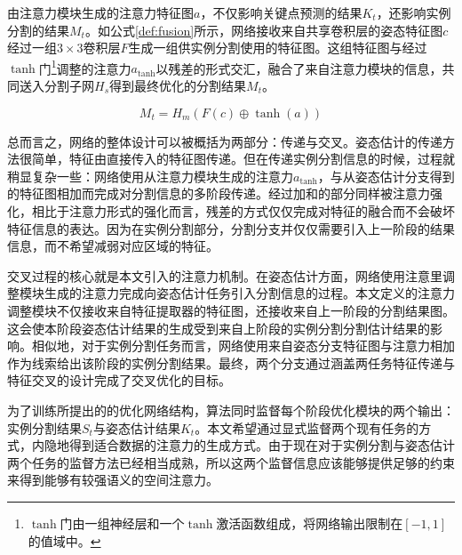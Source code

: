 由注意力模块生成的注意力特征图$a$，不仅影响关键点预测的结果$K_t$，还影响实例分割的结果$M_t$。如公式\eqref{def:fusion}所示，网络接收来自共享卷积层的姿态特征图$c$经过一组$3\times3$卷积层$F$生成一组供实例分割使用的特征图。这组特征图与经过$\tanh$门\footnote{$\tanh$门由一组神经层和一个$\tanh$激活函数组成，将网络输出限制在$[-1, 1]$的值域中。}调整的注意力$a_{\tanh}$以残差的形式交汇，融合了来自注意力模块的信息，共同送入分割子网$H_s$得到最终优化的分割结果$M_t$。

\begin{equation}
\label{def:fusion}
M_t = H_m(F(c) \oplus \tanh(a))
\end{equation}

总而言之，网络的整体设计可以被概括为两部分：传递与交叉。姿态估计的传递方法很简单，特征由直接传入的特征图传递。但在传递实例分割信息的时候，过程就稍显复杂一些：网络使用从注意力模块生成的注意力$a_{\tanh}$，与从姿态估计分支得到的特征图相加而完成对分割信息的多阶段传递。经过加和的部分同样被注意力强化，相比于注意力形式的强化而言，残差的方式仅仅完成对特征的融合而不会破坏特征信息的表达。因为在实例分割部分，分割分支并仅仅需要引入上一阶段的结果信息，而不希望减弱对应区域的特征。

交叉过程的核心就是本文引入的注意力机制。在姿态估计方面，网络使用注意里调整模块生成的注意力完成向姿态估计任务引入分割信息的过程。本文定义的注意力调整模块不仅接收来自特征提取器的特征图，还接收来自上一阶段的分割结果图。这会使本阶段姿态估计结果的生成受到来自上阶段的实例分割分割估计结果的影响。相似地，对于实例分割任务而言，网络使用来自姿态分支特征图与注意力相加作为线索给出该阶段的实例分割结果。最终，两个分支通过涵盖两任务特征传递与特征交叉的设计完成了交叉优化的目标。

为了训练所提出的的优化网络结构，算法同时监督每个阶段优化模块的两个输出：实例分割结果$S_t$与姿态估计结果$K_t$。本文希望通过显式监督两个现有任务的方式，内隐地得到适合数据的注意力的生成方式。由于现在对于实例分割与姿态估计两个任务的监督方法已经相当成熟，所以这两个监督信息应该能够提供足够的约束来得到能够有较强语义的空间注意力。

